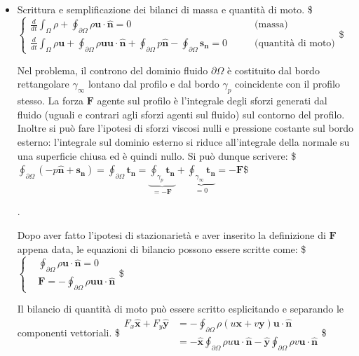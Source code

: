 \documentclass[letterpaper,10pt,italian]{jupyterBook}
\begin{document}
\begin{itemize}
\item {} 
\sphinxAtStartPar
Scrittura e semplificazione dei bilanci di massa e quantità di moto.
\$\(\begin{cases}
       \frac{d}{d t} \int_{\Omega} \rho + \oint_{\partial \Omega} \rho \bm{u} \cdot \hat{\bm{n}} = 0 & \qquad \text{(massa)} \\
       \frac{d}{d t} \int_{\Omega} \rho \bm{u} + \oint_{\partial \Omega} \rho \bm{u} \bm{u} \cdot \hat{\bm{n}} +
        \oint_{\partial \Omega} p \hat{\bm{n}} - \oint_{\partial \Omega} \bm{s_n} = 0  
        & \qquad \text{(quantità di moto)}  %
      \end{cases}\)\$

\sphinxAtStartPar
Nel problema, il controno del dominio fluido \(\partial \Omega\) è
costituito dal bordo rettangolare \(\gamma_\infty\) lontano dal
profilo e dal bordo \(\gamma_p\) coincidente con il profilo stesso. La
forza \(\bm{F}\) agente sul profilo è l’integrale degli sforzi
generati dal fluido (uguali e contrari agli sforzi agenti sul
fluido) sul contorno del profilo. Inoltre si può fare l’ipotesi di
sforzi viscosi nulli e pressione costante sul bordo esterno:
l’integrale sul dominio esterno si riduce all’integrale della
normale su una superficie chiusa ed è quindi nullo. Si può dunque
scrivere:
\$\(\oint_{\partial \Omega} (-p \hat{\bm{n}} + \bm{s_n}) = \oint_{\partial \Omega} \bm{t_n} = \underbrace{\oint_{\gamma_p} \bm{t_n}}_{=-\bm{F}} + \underbrace{\oint_{\gamma_\infty} \bm{t_n}}_{=0} = -\bm{F}\)\$

\sphinxAtStartPar
{}.

\sphinxAtStartPar
Dopo aver fatto l’ipotesi di stazionarietà e aver inserito la
definizione di \(\bm{F}\) appena data, le equazioni di bilancio
possono essere scritte come: \$\(\begin{cases}
      & \oint_{\partial \Omega} \rho \bm{u} \cdot \hat{\bm{n}} = 0  \\
      & \bm{F} = - \oint_{\partial \Omega} \rho \bm{u} \bm{u} \cdot \hat{\bm{n}} 
      \end{cases}
    \label{eqn:airfoil_bil_int}\)\$

\sphinxAtStartPar
Il bilancio di quantità di moto può essere scritto esplicitando e
separando le componenti vettoriali. \$\(\begin{aligned}
       F_x\bm{\hat{x}} + F_y\bm{\hat{y}} 
& = - \oint_{\partial \Omega} \rho (u \bm{x} + v \bm{y}) \bm{u} \cdot \hat{\bm{n}} \\
& =       - \bm{\hat{x}} \oint_{\partial \Omega} \rho u \bm{u} \cdot \hat{\bm{n}} -  \bm{\hat{y}} \oint_{\partial \Omega} \rho v  \bm{u} \cdot \hat{\bm{n}}
    \end{aligned}\)\$


\end{itemize}
\end{document}
